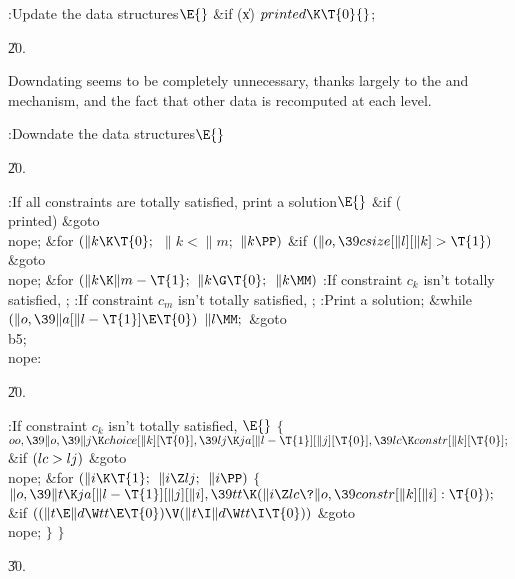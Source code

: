 \Y\B\4:Update the data structures\X${}\E{}$\6
\&{if} (\|x)\1\5
${}\\{printed}\K\T{0}{}$;\2\par
\U20.\fi

Downdating seems to be completely
unnecessary, thanks largely to
the  and  mechanism, and the fact that other data
is recomputed at each level.

\Y\B\4:Downdate the data structures\X${}\E{}$\par
\U20.\fi

\B{}:If all constraints are totally
satisfied, print a solution\X${}\E{}$\6
\&{if} (\\{printed})\1\5
\&{goto} \\{nope};\2\6
\&{for} ${}(\|k\K\T{0};{}$ ${}\|k<\|m;{}$ ${}\|k\PP){}$\1\6
\&{if} ${}(\|o,\39\\{csize}[\|l][\|k]>\T{1}){}$\1\5
\&{goto} \\{nope};\2\2\6
\&{for} ${}(\|k\K\|m-\T{1};{}$ ${}\|k\G\T{0};{}$ ${}\|k\MM){}$\1\5
:If constraint $c_k$ isn't totally satisfied, \X;\2\6
:If constraint $c_m$ isn't totally satisfied, \X;\6
:Print a solution\X;\6
\&{while} ${}(\|o,\39\|a[\|l-\T{1}]\E\T{0}){}$\1\5
${}\|l\MM;{}$\2\6
\&{goto} \\{b5}; \\{nope}:\par
\U20.\fi

\B{}:If constraint $c_k$ isn't totally
satisfied, \X${}\E{}$\6
${}\{{}$\1\6
${}\\{oo},\39\|o,\39\|j\K\\{choice}[\|k][\T{0}],\39\\{lj}\K\\{ja}[\|l-\T{1}][%
\|j][\T{0}],\39\\{lc}\K\\{constr}[\|k][\T{0}];{}$\6
\&{if} ${}(\\{lc}>\\{lj}){}$\1\5
\&{goto} \\{nope};\2\6
\&{for} ${}(\|i\K\T{1};{}$ ${}\|i\Z\\{lj};{}$ ${}\|i\PP){}$\5
${}\{{}$\1\6
${}\|o,\39\|t\K\\{ja}[\|l-\T{1}][\|j][\|i],\39\\{tt}\K(\|i\Z\\{lc}\?\|o,\39%
\\{constr}[\|k][\|i]:\T{0});{}$\6
\&{if} ${}((\|t\E\|d\W\\{tt}\E\T{0})\V(\|t\I\|d\W\\{tt}\I\T{0})){}$\1\5
\&{goto} \\{nope};\2\6
\4${}\}{}$\2\6
\4${}\}{}$\2\par
\U30.\fi

